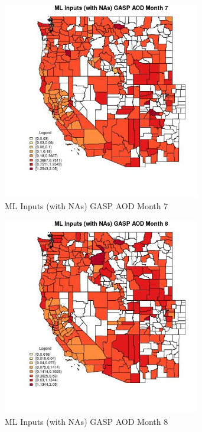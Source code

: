 \clearpage 

\begin{figure} 
\centering  
\includegraphics[width=0.77\textwidth]{Code_Outputs/Report_ML_input_PM25_Step4_part_e_de_duplicated_aves_compiled_2019-05-21wNAs_CountyGASP_AODmedianMonth7.jpg} 
\caption{\label{fig:Report_ML_input_PM25_Step4_part_e_de_duplicated_aves_compiled_2019-05-21wNAsCountyGASP_AODmedianMonth7}ML Inputs (with NAs) GASP AOD Month 7} 
\end{figure} 
 

\begin{figure} 
\centering  
\includegraphics[width=0.77\textwidth]{Code_Outputs/Report_ML_input_PM25_Step4_part_e_de_duplicated_aves_compiled_2019-05-21wNAs_CountyGASP_AODmedianMonth8.jpg} 
\caption{\label{fig:Report_ML_input_PM25_Step4_part_e_de_duplicated_aves_compiled_2019-05-21wNAsCountyGASP_AODmedianMonth8}ML Inputs (with NAs) GASP AOD Month 8} 
\end{figure} 
 

